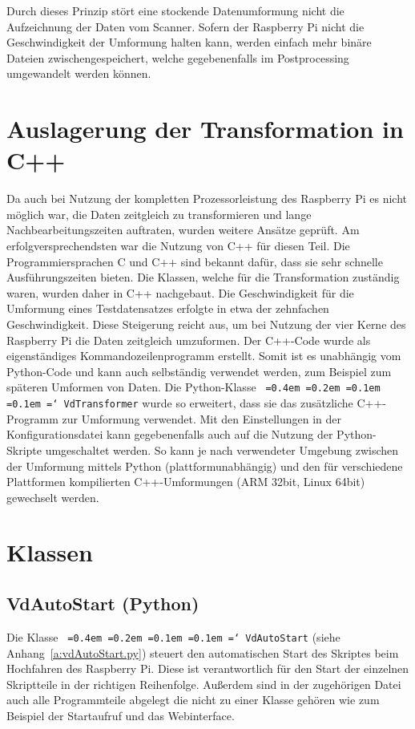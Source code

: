 \documentclass[a4paper,12pt,bibliography=totoc, listof=totoc,titlepage,pointlessnumbers]{scrreprt}
\newcommand*\justify{%
  \fontdimen2\font=0.4em%
  \fontdimen3\font=0.2em%
  \fontdimen4\font=0.1em%
  \fontdimen7\font=0.1em%
  \hyphenchar\font=`\-%
}
\newcommand{\code}[1]{\texttt{\justify{#1}}}
\begin{document}
Durch dieses Prinzip stört eine stockende Datenumformung nicht die Aufzeichnung der Daten vom Scanner. Sofern der Rasp\-berry Pi nicht die Geschwindigkeit der Umformung halten kann, werden einfach mehr binäre Dateien zwischengespeichert, welche gegebenenfalls im Postprocessing umgewandelt werden können.

\section{Auslagerung der Transformation in C++}
Da auch bei Nutzung der kompletten Prozessorleistung des Rasp\-berry Pi es nicht möglich war, die Daten zeitgleich zu transformieren und lange Nachbearbeitungszeiten auftraten, wurden weitere Ansätze geprüft. Am erfolgversprechendsten war die Nutzung von C++ für diesen Teil. Die Programmiersprachen C und C++ sind bekannt dafür, dass sie sehr schnelle Aus\-füh\-rungs\-zei\-ten bieten. Die Klassen, welche für die Transformation zuständig waren, wurden daher in C++ nachgebaut. Die Geschwindigkeit für die Umformung eines Testdatensatzes erfolgte in etwa der zehnfachen Geschwindigkeit. Diese Steigerung reicht aus, um bei Nutzung der vier Kerne des Rasp\-berry Pi die Daten zeitgleich umzuformen. Der C++-Code wurde als eigenständiges Kommandozeilenprogramm erstellt. Somit ist es unabhängig vom Python-Code und kann auch selbständig verwendet werden, zum Beispiel zum späteren Umformen von Daten.
Die Python-Klasse \code{VdTransformer} wurde so erweitert, dass sie das zusätzliche C++-Programm zur Umformung verwendet. Mit den Einstellungen in der Konfigurationsdatei kann gegebenenfalls auch auf die Nutzung der Python-Skripte umgeschaltet werden. So kann je nach verwendeter Umgebung zwischen der Umformung mittels Python (plattformunabhängig) und den für verschiedene Plattformen kompilierten C++-Umformungen (ARM 32bit, Linux 64bit) gewechselt werden.

\section{Klassen}
\label{s:klassen}

\subsection{VdAutoStart (Python)}
Die Klasse \code{VdAutoStart} (siehe Anhang~\ref{a:vdAutoStart.py}) steuert den automatischen Start des Skriptes beim Hochfahren des Rasp\-berry Pi. Diese ist verantwortlich für den Start der einzelnen Skriptteile in der richtigen Reihenfolge. Außerdem sind in der zugehörigen Datei auch alle Programmteile abgelegt die nicht zu einer Klasse gehören wie zum Beispiel der Startaufruf und das Webinterface.
\end{document}
